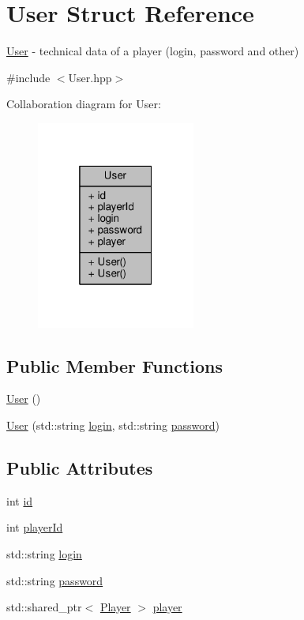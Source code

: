 \hypertarget{struct_user}{\section{User Struct Reference}
\label{struct_user}
}


\hyperlink{struct_user}{User} -\/ technical data of a player (login, password and other)  




{\ttfamily \#include $<$User.\-hpp$>$}



Collaboration diagram for User\-:
\nopagebreak
\begin{figure}[H]
\begin{center}
\leavevmode
\includegraphics[width=148pt]{struct_user__coll__graph}
\end{center}
\end{figure}
\subsection*{Public Member Functions}
\begin{DoxyCompactItemize}
\item 
\hyperlink{struct_user_a4a0137053e591fbb79d9057dd7d2283d}{User} ()
\item 
\hyperlink{struct_user_a074cc382f1a4178c6af5b8d7fdc505e7}{User} (std\-::string \hyperlink{struct_user_a68ef4336327a1ee8b4532a6042485f3a}{login}, std\-::string \hyperlink{struct_user_ac2f2e75b15e8eb6cbb030fc85a6cd59f}{password})
\end{DoxyCompactItemize}
\subsection*{Public Attributes}
\begin{DoxyCompactItemize}
\item 
int \hyperlink{struct_user_aa7e6e39b43020bbe9c3a196b3689b0f7}{id}
\item 
int \hyperlink{struct_user_add1a0a4d41bf6d364738b19f2cee96a6}{player\-Id}
\item 
std\-::string \hyperlink{struct_user_a68ef4336327a1ee8b4532a6042485f3a}{login}
\item 
std\-::string \hyperlink{struct_user_ac2f2e75b15e8eb6cbb030fc85a6cd59f}{password}
\item 
std\-::shared\-\_\-ptr$<$ \hyperlink{struct_player}{Player} $>$ \hyperlink{struct_user_a55d128918fa7d3e66120d392092227fd}{player}
\end{DoxyCompactItemize}


